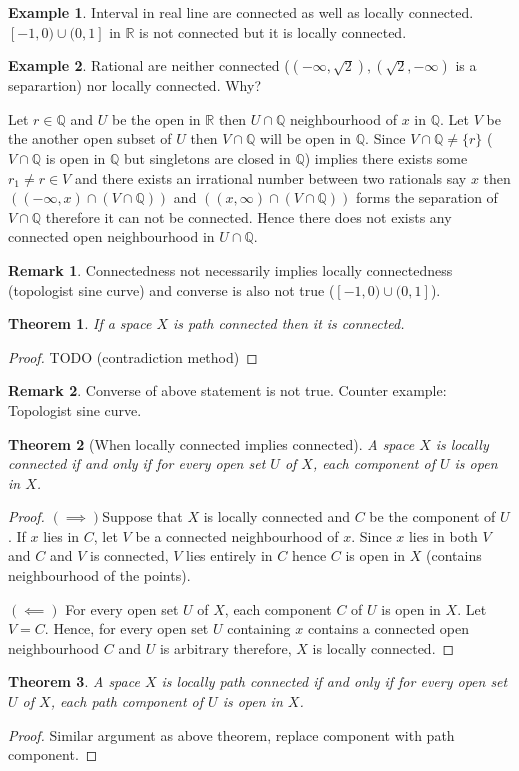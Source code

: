 \documentclass[12pt,reqno]{amsart}
\theoremstyle{plain}
\newtheorem{thm}{Theorem}
\theoremstyle{definition}
\newtheorem{eg}{Example}
\newtheorem{rem}{Remark}
\newcommand{\bb}[1]{\mathbb{#1}}
\begin{document}
\begin{eg}
    Interval in real line are connected as well as locally connected. $[-1,0) \cup (0,1]$ in $\bb R$ is not connected but it is locally connected.
\end{eg}
\begin{eg}
    Rational are neither connected ($(-\infty, \sqrt{2}),(\sqrt{2},-\infty)$ is a separartion) nor locally connected. Why?

    Let $r \in \bb Q$ and $U$ be the open in $\bb R$ then $U \cap \bb Q$ neighbourhood of $x$ in $\bb Q$. Let $V$ be the another open subset of $U$ then $V \cap \bb Q$ will be open in $\bb Q$. Since $V \cap \bb Q \neq \{r\}$ ($V \cap \bb Q$ is open in $\bb Q$ but singletons are closed in $\bb Q$) implies there exists some $r_1 \neq r \in V$ and there exists an irrational number between two rationals say $x$ then $((-\infty, x) \cap (V \cap \bb Q))$ and $((x, \infty) \cap (V \cap \bb Q))$ forms the separation of $V \cap \bb Q$ therefore it can not be connected. Hence there does not exists any connected open neighbourhood in $U \cap \bb Q$.
\end{eg}
\begin{rem}
    Connectedness not necessarily implies locally connectedness (topologist sine curve) and converse is also not true ($[-1,0) \cup (0,1]$).   
\end{rem}
\begin{thm}
    If a space $X$ is path connected then it is connected. 
\end{thm}
\begin{proof}
    TODO (contradiction method)
\end{proof}
\begin{rem}
    Converse of above statement is not true. Counter example: Topologist sine curve.
\end{rem}
\begin{thm}[When locally connected implies connected]
    A space $X$ is locally connected if and only if for every open set $U$ of $X$, each component of $U$ is open in $X$.
\end{thm}
\begin{proof}
    $(\implies)$Suppose that $X$ is locally connected and $C$ be the component of $U$. If $x$ lies in $C$, let $V$ be a connected neighbourhood of $x$. Since $x$ lies in both $V$ and $C$ and $V$ is connected, $V$ lies entirely in $C$ hence $C$ is open in $X$ (contains neighbourhood of the points).

    \noindent $(\impliedby)$ For every open set $U$ of $X$, each component $C$ of $U$ is open in $X$. Let $V = C$. Hence, for every open set $U$ containing $x$ contains a connected open neighbourhood $C$ and $U$ is arbitrary therefore, $X$ is locally connected.
\end{proof}
\begin{thm}
    A space $X$ is locally path connected if and only if for every open set $U$ of $X$, each path component of $U$ is open in $X$.
\end{thm}
\begin{proof}
    Similar argument as above theorem, replace component with path component.
\end{proof}
\end{document}
